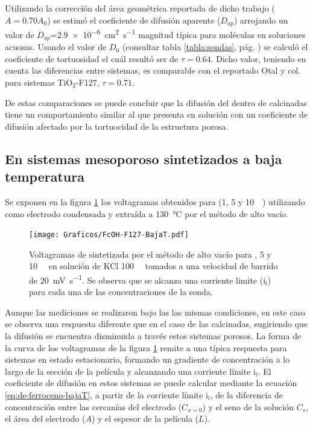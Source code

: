 	 Utilizando la corrección del área geométrica reportada de dicho trabajo ($A\!=\!0.70A_0$) se estimó el coeficiente de difusión aparente ($D_{ap}$) arrojando un valor de $D_{ap}$=\SI{2,9e-6}{\square\cm\per\second} magnitud típica para moléculas en soluciones acuosas.\cite{koryta1993,Otal2006,longinotti2007} Usando el valor de $D_0$ (consultar tabla \ref{tabla:sondas}, pág. \pageref{tabla:sondas}) se calculó el coeficiente de tortuosidad el cuál resultó ser de $\tau=0.64$. Dicho valor, teniendo en cuenta las diferencias entre sistemas, es comparable con el reportado Otal y col. para sistemas TiO$_2$-F127, $\tau=0.71$.

	  De estas comparaciones se puede concluir que la difusión del \fc\space dentro de \pdmF\space calcinadas tiene un comportamiento similar al que presenta en solución con un coeficiente de difusión afectado por la tortuocidad de la estructura porosa.
  	
	\subsection{En sistemas mesoporoso sintetizados a baja temperatura}

		Se exponen en la figura \ref{fig:fcoh_bajaT} los voltagramas obtenidos para \fc\space (1, 5 y \SI{10}{\milli\Molar}) utilizando como electrodo \pdmF\space condensada y extraída a \SI{130}{\celsius} por el método de alto vacío. 
				
					\begin{figure}[h!]
				\centering
		 	    \texttt{[image: Graficos/FcOH-F127-BajaT.pdf]}
		        \caption[Voltagrama para \fc\space en \pdm\space de baja temperatura]{Voltagramas de \pdmF\space sintetizada por el método de alto vacío para \fc{}, 5 y \SI{10}{\milli\Molar} en solución de KCl \SI{100}{\milli\Molar} tomados a una velocidad de barrido de \SI{20}{\milli\volt\per\second}. Se observa que se alcanza una corriente limite ($\text{i}_l$) para cada una de las concentraciones de la sonda.}
		        \label{fig:fcoh_bajaT}
		      	\end{figure}

		Aunque las mediciones se realizaron bajo las las mismas condiciones, en este caso se observa una respuesta diferente que en el caso de las \pdmF\space calcinadas, sugiriendo que la difusión se encuentra disminuida a través estos sistemas porosos. La forma de la curva de los voltagramas de la figura \ref{fig:fcoh_bajaT} remite a una típica respuesta para sistemas en estado estacionario, formando un gradiente de concentración a lo largo de la sección de la película y alcanzando una corriente límite $\text{i}_l$. 
		El coeficiente de difusión en estos sistemas se puede calcular mediante la ecuación \ref{eq:de-ferroceno-bajaT}, a partir de la corriente límite $\text{i}_l$, de la diferencia de concentración entre las cercanías del electrodo ($C_{x=0}$) y el seno de la solución $C_s$, el área del electrodo ($A$) y el espesor de la película ($L$).

